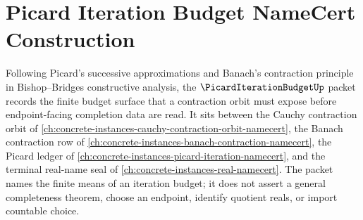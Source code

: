 \chapter{Picard Iteration Budget NameCert Construction}
\label{ch:concrete-instances-picard-iteration-budget-namecert}

Following Picard's successive approximations and Banach's contraction principle in Bishop--Bridges constructive analysis, the $\PicardIterationBudgetUp$ packet records the finite budget surface that a contraction orbit must expose before endpoint-facing completion data are read. It sits between the Cauchy contraction orbit of \autoref{ch:concrete-instances-cauchy-contraction-orbit-namecert}, the Banach contraction row of \autoref{ch:concrete-instances-banach-contraction-namecert}, the Picard ledger of \autoref{ch:concrete-instances-picard-iteration-namecert}, and the terminal real-name seal of \autoref{ch:concrete-instances-real-namecert}. The packet names the finite means of an iteration budget; it does not assert a general completeness theorem, choose an endpoint, identify quotient reals, or import countable choice.


